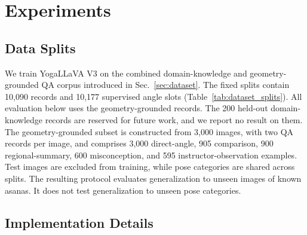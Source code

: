 \documentclass[conference]{IEEEtran}
\begin{document}
\section{Experiments}
\label{sec:experimental_setup}

\subsection{Data Splits}
\label{sec:dataset_splits}

We train YogaLLaVA V3 on the combined domain-knowledge and geometry-grounded QA corpus introduced in Sec.~\ref{sec:dataset}.
The fixed splits contain 10,090 records and 10,177 supervised angle slots (Table~\ref{tab:dataset_splits}).
All evaluation below uses the geometry-grounded records.
The 200 held-out domain-knowledge records are reserved for future work, and we report no result on them.
The geometry-grounded subset is constructed from 3,000 images, with two QA records per image, and comprises 3,000 direct-angle, 905 comparison, 900 regional-summary, 600 misconception, and 595 instructor-observation examples.
Test images are excluded from training, while pose categories are shared across splits.
The resulting protocol evaluates generalization to unseen images of known asanas.
It does not test generalization to unseen pose categories.

\begin{table}[t]
    \centering
    \caption{Composition of the instruction-tuning corpus.}
    \label{tab:dataset_splits}
\end{table}

\subsection{Implementation Details}
\label{sec:implementation_details}
\end{document}
